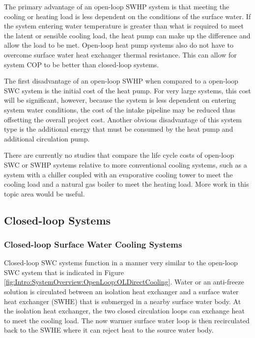 The primary advantage of an open-loop SWHP system is that meeting the cooling or heating load is less dependent on the conditions of the surface water. If the system entering water temperature is greater than what is required to meet the latent or sensible cooling load, the heat pump can make up the difference and allow the load to be met. Open-loop heat pump systems also do not have to overcome surface water heat exchanger thermal resistance. This can allow for system COP to be better than closed-loop systems.

The first disadvantage of an open-loop SWHP when compared to a open-loop SWC system is the initial cost of the heat pump. For very large systems, this cost will be significant, however, because the system is less dependent on entering system water conditions, the cost of the intake pipeline may be reduced thus offsetting the overall project cost. Another obvious disadvantage of this system type is the additional energy that must be consumed by the heat pump and additional circulation pump.

There are currently no studies that compare the life cycle costs of open-loop SWC or SWHP systems relative to more conventional cooling systems, such as a system with a chiller coupled with an evaporative cooling tower to meet the cooling load and a natural gas boiler to meet the heating load. More work in this topic area would be useful.

	\subsection{Closed-loop Systems}
	\label{subsec:Intro:SystemOverview:ClosedLoop}

		\subsubsection{Closed-loop Surface Water Cooling Systems}

Closed-loop SWC systems function in a manner very similar to the open-loop SWC system that is indicated in Figure \ref{fig:Intro:SystemOverview:OpenLoop:OLDirectCooling}. Water or an anti-freeze solution is circulated between an isolation heat exchanger and a surface water heat exchanger (SWHE) that is submerged in a nearby surface water body. At the isolation heat exchanger, the two closed circulation loops can exchange heat to meet the cooling load. The now warmer surface water loop is then recirculated back to the SWHE where it can reject heat to the source water body.

